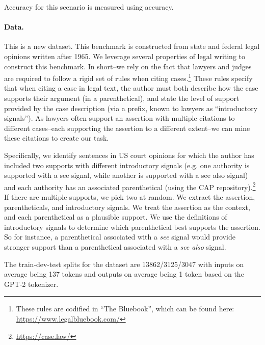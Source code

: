 Accuracy for this scenario is measured using accuracy. 

\paragraph{Data.}
This is a new dataset. This benchmark is constructed from state and federal legal opinions written after 1965. We leverage several properties of legal writing to construct this benchmark. In short–we rely on the fact that lawyers and judges are required to follow a rigid set of rules when citing cases.\footnote{These rules are codified in ``The Bluebook'', which can be found here: \url{https://www.legalbluebook.com/}} These rules specify that when citing a case in legal text, the author must both describe how the case supports their argument (in a parenthetical), and state the level of support provided by the case description (via a prefix, known to lawyers as ``introductory signals''). As lawyers often support an assertion with multiple citations to different cases--each supporting the assertion to a different extent--we can mine these citations to create our task.

Specifically, we identify sentences in US court opinions for which the author has included two supports with different introductory signals (e.g. one authority is supported with a see signal, while another is supported with a see also signal) and each authority has an associated parenthetical (using the CAP repository).\footnote{\url{https://case.law/}} If there are multiple supports, we pick two at random. We extract the assertion, parentheticals, and introductory signals. We treat the assertion as the context, and each parenthetical as a plausible support. We use the definitions of introductory signals to determine which parenthetical best supports the assertion. So for instance, a parenthetical associated with a \textit{see} signal would provide stronger support than a parenthetical associated with a \textit{see also} signal.

 
The train-dev-test splits for the dataset are 13862/3125/3047 with inputs on average being 137 tokens and outputs on average being 1 token based on the GPT-2 tokenizer.


